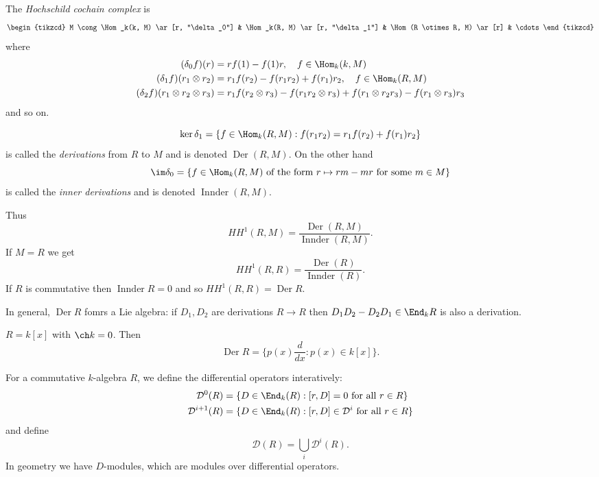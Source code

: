 \documentclass[a4paper]{article}
\DeclareMathOperator{\Der}{Der}
\DeclareMathOperator{\Innder}{Innder}
\begin{document}
\begin{definition}
  The \emph{Hochschild cochain complex} is
  \[
    \begin{tikzcd}
      M \cong \Hom_k(k, M) \ar[r, "\delta_0"] & \Hom_k(R, M) \ar[r, "\delta_1"] & \Hom(R \otimes R, M) \ar[r] & \cdots
    \end{tikzcd}
  \]
  where
  \begin{align*}
    (\delta_0 f)(r) &= rf(1) - f(1) r, \quad f \in \Hom_k(k, M) \\
    (\delta_1 f)(r_1 \otimes r_2) &= r_1 f(r_2) - f(r_1r_2) + f(r_1)r_2, \quad f \in \Hom_k(R, M) \\
    (\delta_2 f)(r_1 \otimes r_2 \otimes r_3) &= r_1 f(r_2 \otimes r_3) - f(r_1r_2 \otimes r_3) + f(r_1 \otimes r_2r_3) - f(r_1 \otimes r_3) r_3 \\
  \end{align*}
  and so on.
\end{definition}

\begin{definition}
  \[
    \ker \delta_1 = \{f \in \Hom_k(R, M): f(r_1r_2) = r_1f(r_2) + f(r_1)r_2\}
  \]
  is called the \emph{derivations} from \(R\) to \(M\) and is denoted \(\Der(R, M)\). On the other hand
  \[
    \im \delta_0 = \{f \in \Hom_k(R, M) \text{ of the form } r \mapsto rm - mr \text{ for some } m \in M\}
  \]
  is called the \emph{inner derivations} and is denoted \(\Innder(R, M)\).
\end{definition}

Thus
\[
  HH^1(R, M) = \frac{\Der(R, M)}{\Innder(R, M)}.
\]
If \(M = R\) we get
\[
  HH^1(R, R) = \frac{\Der(R)}{\Innder(R)}.
\]
If \(R\) is commutative then \(\Innder R = 0\) and so \(HH^1(R, R) = \Der R\).

In general, \(\Der R\) fomrs a Lie algebra: if \(D_1, D_2\) are derivations \(R \to R\) then \(D_1D_2 - D_2D_1 \in \End_k R\) is also a derivation.

\begin{eg}
  \(R = k[x]\) with \(\ch k = 0\). Then
  \[
    \Der R = \{p(x) \frac{d}{dx}: p(x) \in k[x]\}.
  \]
\end{eg}

For a commutative \(k\)-algebra \(R\), we define the differential operators interatively:
\begin{align*}
  \mathcal D^0(R) &= \{D \in \End_k(R): [r, D] = 0 \text{ for all } r \in R\} \\
  \mathcal D^{i + 1} (R) &= \{D \in \End_k(R): [r, D] \in \mathcal D^i \text{ for all } r \in R\} \\
\end{align*}
and define
\[
  \mathcal D(R) = \bigcup_i \mathcal D^i(R).
\]
In geometry we have \(D\)-modules, which are modules over differential operators.
\end{document}
